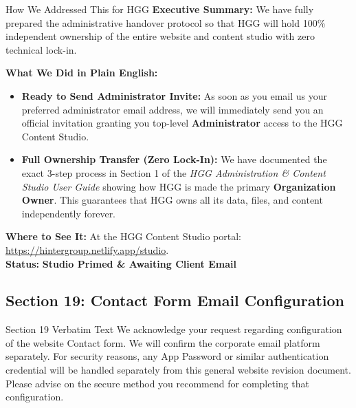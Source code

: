 \documentclass[11pt,a4paper]{article}
\begin{document}
\begin{DetailedResolutionBox}{How We Addressed This for HGG}
\textbf{Executive Summary:} We have fully prepared the administrative handover protocol so that HGG will hold 100\% independent ownership of the entire website and content studio with zero technical lock-in.

\textbf{What We Did in Plain English:}
\begin{itemize}
    \item \textbf{Ready to Send Administrator Invite:} As soon as you email us your preferred administrator email address, we will immediately send you an official invitation granting you top-level \textbf{Administrator} access to the HGG Content Studio.
    \item \textbf{Full Ownership Transfer (Zero Lock-In):} We have documented the exact 3-step process in Section 1 of the \textit{HGG Administration \& Content Studio User Guide} showing how HGG is made the primary \textbf{Organization Owner}. This guarantees that HGG owns all its data, files, and content independently forever.
\end{itemize}

\textbf{Where to See It:} At the HGG Content Studio portal: \url{https://hintergroup.netlify.app/studio}. \\
\textbf{Status:} \textcolor{HGGGreen}{\textbf{Studio Primed \& Awaiting Client Email}}
\end{DetailedResolutionBox}

\vspace{0.3cm}

\subsection{Section 19: Contact Form Email Configuration}

\begin{VerbatimClientBox}{Section 19 Verbatim Text}
We acknowledge your request regarding configuration of the website Contact form.
We will confirm the corporate email platform separately.
For security reasons, any App Password or similar authentication credential will be handled separately from this general website revision document.
Please advise on the secure method you recommend for completing that configuration.
\end{VerbatimClientBox}
\end{document}
